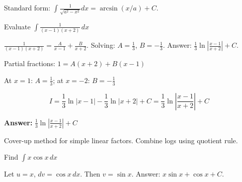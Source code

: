 \begin{takeaways}
Standard form: $\int \frac{1}{\sqrt{a^2-x^2}}dx = \arcsin(x/a) + C$.
\end{takeaways}

\vspace{1cm}

\begin{problem}
Evaluate $\displaystyle \int \frac{1}{(x-1)(x+2)} \, dx$
\end{problem}

\begin{hint}
$\frac{1}{(x-1)(x+2)} = \frac{A}{x-1} + \frac{B}{x+2}$. Solving: $A=\frac{1}{3}$, $B=-\frac{1}{3}$. Answer: $\frac{1}{3}\ln\left|\frac{x-1}{x+2}\right| + C$.
\end{hint}

\begin{solution}
Partial fractions: $1 = A(x+2) + B(x-1)$

At $x=1$: $A=\frac{1}{3}$; at $x=-2$: $B=-\frac{1}{3}$

\[
I = \frac{1}{3}\ln|x-1| - \frac{1}{3}\ln|x+2| + C = \frac{1}{3}\ln\left|\frac{x-1}{x+2}\right| + C
\]

\textbf{Answer:} $\boxed{\frac{1}{3}\ln\left|\frac{x-1}{x+2}\right| + C}$
\end{solution}

\begin{takeaways}
Cover-up method for simple linear factors. Combine logs using quotient rule.
\end{takeaways}

\vspace{1cm}

\begin{problem}
Find $\displaystyle \int x \cos x \, dx$
\end{problem}

\begin{hint}
Let $u = x$, $dv = \cos x \, dx$. Then $v = \sin x$. Answer: $x\sin x + \cos x + C$.
\end{hint}

